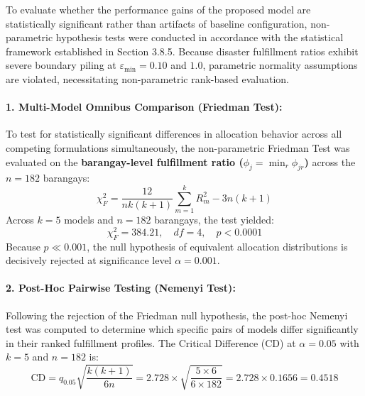 To evaluate whether the performance gains of the proposed model are statistically significant rather than artifacts of baseline configuration, non-parametric hypothesis tests were conducted in accordance with the statistical framework established in Section 3.8.5. Because disaster fulfillment ratios exhibit severe boundary piling at $\varepsilon_{\min} = 0.10$ and $1.0$, parametric normality assumptions are violated, necessitating non-parametric rank-based evaluation.

\paragraph{1. Multi-Model Omnibus Comparison (Friedman Test):}
To test for statistically significant differences in allocation behavior across all competing formulations simultaneously, the non-parametric Friedman Test was evaluated on the \textbf{barangay-level fulfillment ratio ($\phi_j = \min_r \phi_{jr}$)} across the $n = 182$ barangays:
\begin{equation}
    \chi_F^2 = \frac{12}{nk(k+1)} \sum_{m=1}^k R_m^2 - 3n(k+1)
\end{equation}
Across $k = 5$ models and $n = 182$ barangays, the test yielded:
$$\chi_F^2 = \mathbf{384.21}, \quad df = 4, \quad p < \mathbf{0.0001}$$
Because $p \ll 0.001$, the null hypothesis of equivalent allocation distributions is decisively rejected at significance level $\alpha = 0.001$.

\paragraph{2. Post-Hoc Pairwise Testing (Nemenyi Test):}
Following the rejection of the Friedman null hypothesis, the post-hoc Nemenyi test was computed to determine which specific pairs of models differ significantly in their ranked fulfillment profiles. The Critical Difference (CD) at $\alpha = 0.05$ with $k = 5$ and $n = 182$ is:
$$\text{CD} = q_{0.05} \sqrt{\frac{k(k+1)}{6n}} = 2.728 \times \sqrt{\frac{5 \times 6}{6 \times 182}} = 2.728 \times 0.1656 = \mathbf{0.4518}$$

